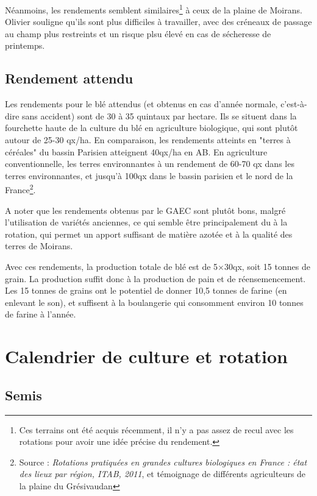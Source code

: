 \documentclass{article}
\begin{document}
Néanmoins, les rendements semblent similaires\footnote{Ces terrains ont été acquis récemment, il n'y a pas assez de recul avec les rotations pour avoir une idée précise du rendement.} à ceux de la plaine de Moirans. Olivier souligne qu'ils sont plus difficiles à travailler, avec des créneaux de passage au champ plus restreints et un risque plsu élevé en cas de sécheresse de printemps.

\subsection{Rendement attendu}

Les rendements pour le blé attendus (et obtenus en cas d'année normale, c'est-à-dire sans accident) sont de 30 à 35 quintaux par hectare. Ils se situent dans la fourchette haute de la culture du blé en agriculture biologique, qui sont plutôt autour de 25-30 qx/ha. En comparaison, les rendements atteints en "terres à céréales" du bassin Parisien atteignent 40qx/ha en AB. En agriculture conventionnelle, les terres environnantes à un rendement de 60-70 qx dans les terres environnantes, et jusqu'à 100qx dans le bassin parisien et le nord de la France\footnote{Source : \textit{Rotations pratiquées en grandes cultures biologiques en France : état des lieux par région, ITAB, 2011}, et témoignage de différents agriculteurs de la plaine du Grésivaudan}. 

A noter que les rendements obtenus par le GAEC sont plutôt bons, malgré l'utilisation de variétés anciennes, ce qui semble être principalement du à la rotation, qui permet un apport suffisant de matière azotée et à la qualité des terres de Moirans.

Avec ces rendements, la production totale de blé est de 5$\times$30qx, soit 15 tonnes de grain. La production suffit donc à la production de pain et de réensemencement. Les 15 tonnes de grains ont le potentiel de donner 10,5 tonnes de farine (en enlevant le son), et suffisent à la boulangerie qui consomment environ 10 tonnes de farine à l'année.

\section{Calendrier de culture et rotation}
\label{part:rotation}

\subsection*{Semis}
\end{document}
